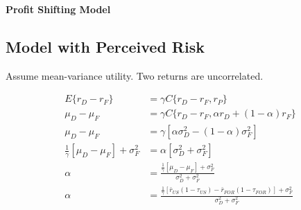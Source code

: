\documentclass[letterpaper,12pt]{article}
\begin{document}
\begin{center}
{\LARGE \bf Profit Shifting Model}
\end{center}

\begin{spacing}{1.5}

\section{Model with Perceived Risk}

	Assume mean-variance utility.  Two returns are uncorrelated.

	\begin{align}
		E\{r_D - r_F\} & = \gamma C\{r_D - r_F,r_P\} \nonumber \\
		\mu_D - \mu_F & = \gamma C\{r_D - r_F,\alpha r_D + (1-\alpha) r_F\} \nonumber \\
		\mu_D - \mu_F & = \gamma \left[ \alpha \sigma^2_D - (1-\alpha) \sigma^2_F \right] \nonumber \\
		\frac{1}{\gamma}\left[\mu_D - \mu_F\right] + \sigma^2_F & = \alpha \left[ \sigma^2_D + \sigma^2_F \right] \nonumber \\
		\alpha & = \frac{\tfrac{1}{\gamma}\left[\mu_D - \mu_F\right] + \sigma^2_F}{\sigma^2_D + \sigma^2_F} \nonumber \\
		\alpha & = \frac{\tfrac{1}{\gamma}\left[\bar r_{US}(1-\tau_{US}) - \bar r_{FOR}(1-\tau_{FOR})\right] + \sigma^2_F}{\sigma^2_D + \sigma^2_F} \nonumber \\
	\end{align}

\end{spacing}
\end{document}
